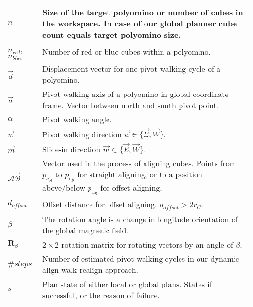 \begin{xltabular}{\textwidth}{ l  X }
	$n$
	&
	Size of the target polyomino or number of cubes in the workspace.
	In case of our global planner cube count equals target polyomino size.
	\\ \midrule
	
	$n_\textit{red}$, $n_\textit{blue}$
	&
	Number of red or blue cubes within a polyomino.
	\\ \midrule
	
	$\vec{d}$
	&
	Displacement vector for one pivot walking cycle of a polyomino.
	\\ \midrule
	
	$\vec{a}$
	&
	Pivot walking axis of a polyomino in global coordinate frame.
	Vector between north and south pivot point.
	\\ \midrule
	
	$\alpha$
	&
	Pivot walking angle.
	\\ \midrule
	
	$\vec{w}$
	&
	Pivot walking direction $\vec{w} \in \{ \vec{E}, \vec{W} \}$.
	\\ \midrule
	
	$\vec{m}$
	&
	Slide-in direction $\vec{m} \in \{ \vec{E}, \vec{W} \}$.
	\\ \midrule
	
	$\overrightarrow{\mathcal{A}\mathcal{B}}$
	&
	Vector used in the process of aligning cubes.
	Points from $p_{c_\mathcal{A}}$ to $p_{c_\mathcal{B}}$ for straight aligning, or to a position above/below $p_{c_\mathcal{B}}$ for offset aligning.
	\\ \midrule
	
	$d_\textit{offset}$
	&
	Offset distance for offset aligning.
	$d_\textit{offset} > 2 r_C$.
	\\ \midrule
	
	$\beta$  
	&
	The rotation angle is a change in longitude orientation of the global magnetic field.
	\\ \midrule
	
	$\mathbf{R}_\beta$  
	&
	$2 \times 2$ rotation matrix for rotating vectors by an angle of $\beta$.
	\\ \midrule
	
	$\#\textit{steps}$
	&
	Number of estimated pivot walking cycles in our dynamic align-walk-realign approach.
	\\ \midrule
	
	$s$
	&
	Plan state of either local or global plans. States if successful, or the reason of failure.
	\\ \midrule
	

\end{xltabular}

